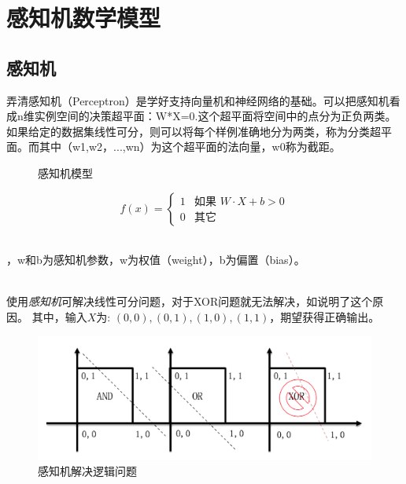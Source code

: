 \chapter{感知机数学模型}
\label{chap:math_perceptron}

\section{感知机}

弄清感知机（Perceptron）是学好支持向量机和神经网络的基础。可以把感知机看成n维实例空间的决策超平面：W*X=0.这个超平面将空间中的点分为正负两类。如果给定的数据集线性可分，则可以将每个样例准确地分为两类，称为分类超平面。而其中（w1,w2，...,wn）为这个超平面的法向量，w0称为截距。

\begin{figure}[!htb]
\centering
{}
\caption{感知机模型}
\label{fig:part2_math_perceptron_module}
\end{figure}


\begin{equation}
f(x) = 
\begin{cases}
1 & \text{如果 $W\cdot X+b > 0$}\\
0 & \text{其它}
\end{cases}
\label{part2_math_perceptron_formula}
\end{equation}

\ \\ \noindent
{}，w和b为感知机参数，w为权值（weight），b为偏置（bias）。

\ \\ \noindent
使用\emph{感知机}可解决线性可分问题，对于XOR问题就无法解决，如说明了这个原因。
其中，输入$X$为: $(0,0),(0,1),(1,0),(1,1)$，期望获得正确输出。

\begin{figure}[!htb]
\centerline{\includegraphics[width=.4\figwidth]{images/logical.png}}
\label{fig:part2_perceptron_logical}
\caption{感知机解决逻辑问题}
\end{figure}

